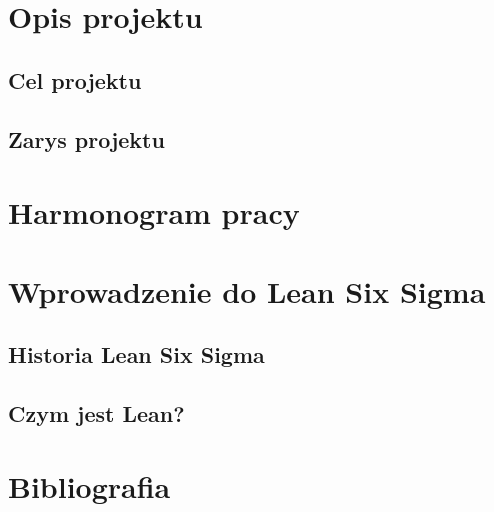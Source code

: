 

\usepackage{url}

                   

\chapter{Opis projektu}
\section{Cel projektu}
  

\section{Zarys projektu}
  

\chapter{Harmonogram pracy}
	
	
\chapter{Wprowadzenie do Lean Six Sigma}
	
	
\section{Historia Lean Six Sigma}
	
	
\section{Czym jest Lean?}
	

\chapter{Bibliografia}
	








